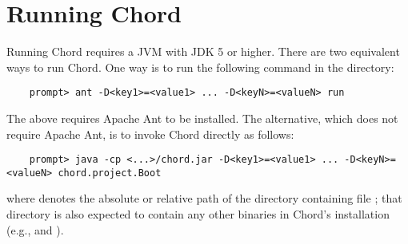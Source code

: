 \section{Running Chord}
\label{sec:running-chord}

Running Chord requires a JVM with JDK 5 or higher.
There are two equivalent ways to run Chord.
One way is to run the following command in the  directory:

\begin{verbatim}
    prompt> ant -D<key1>=<value1> ... -D<keyN>=<valueN> run
\end{verbatim}

The above requires Apache Ant to be installed.  The alternative, which
does not require Apache Ant, is to invoke Chord directly as follows:

\begin{verbatim}
    prompt> java -cp <...>/chord.jar -D<key1>=<value1> ... -D<keyN>=<valueN> chord.project.Boot
\end{verbatim}

where  denotes the absolute or relative path of the directory containing file ;
that directory is also expected to contain any other binaries in Chord's installation
(e.g.,  and ).

